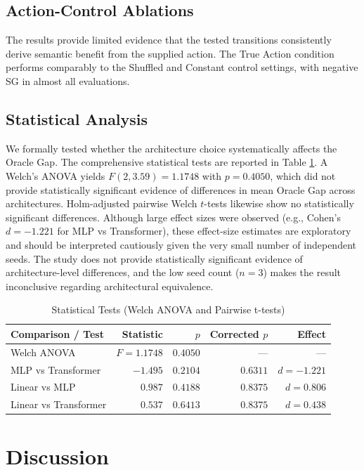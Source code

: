 \documentclass[conference]{IEEEtran}
\begin{document}
\subsection{Action-Control Ablations}
The results provide limited evidence that the tested transitions consistently derive semantic benefit from the supplied action. The True Action condition performs comparably to the Shuffled and Constant control settings, with negative SG in almost all evaluations.

\subsection{Statistical Analysis}
We formally tested whether the architecture choice systematically affects the Oracle Gap. The comprehensive statistical tests are reported in Table \ref{tab:stats}. A Welch's ANOVA yields $F(2,3.59)=1.1748$ with $p=0.4050$, which did not provide statistically significant evidence of differences in mean Oracle Gap across architectures. Holm-adjusted pairwise Welch $t$-tests likewise show no statistically significant differences. Although large effect sizes were observed (e.g., Cohen's $d = -1.221$ for MLP vs Transformer), these effect-size estimates are exploratory and should be interpreted cautiously given the very small number of independent seeds. The study does not provide statistically significant evidence of architecture-level differences, and the low seed count ($n=3$) makes the result inconclusive regarding architectural equivalence.

\begin{table}[h]
\centering
\caption{Statistical Tests (Welch ANOVA and Pairwise t-tests)}
\label{tab:stats}
\begin{tabular}{lrrrr}
\toprule
Comparison / Test & Statistic & $p$ & Corrected $p$ & Effect \\
\midrule
Welch ANOVA & $F=1.1748$ & $0.4050$ & --- & --- \\
MLP vs Transformer & $-1.495$ & $0.2104$ & $0.6311$ & $d=-1.221$ \\
Linear vs MLP & $0.987$ & $0.4188$ & $0.8375$ & $d=0.806$ \\
Linear vs Transformer & $0.537$ & $0.6413$ & $0.8375$ & $d=0.438$ \\
\bottomrule
\end{tabular}
\end{table}

\section{Discussion}
\end{document}

